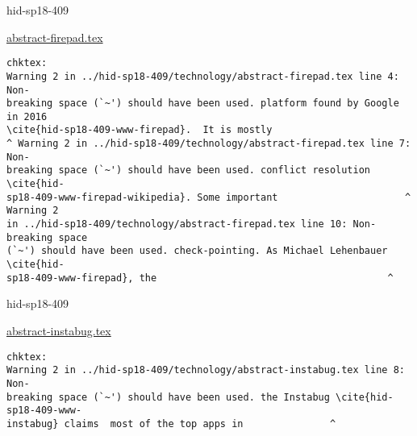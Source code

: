 

\begin{IU}

hid-sp18-409

\href{https://github.com/cloudmesh-community/hid-sp18-409/blob/master//technology/abstract-firepad.tex}{abstract-firepad.tex}

\begin{tiny}
\begin{verbatim}
chktex:
Warning 2 in ../hid-sp18-409/technology/abstract-firepad.tex line 4: Non-
breaking space (`~') should have been used. platform found by Google in 2016
\cite{hid-sp18-409-www-firepad}.  It is mostly
^ Warning 2 in ../hid-sp18-409/technology/abstract-firepad.tex line 7: Non-
breaking space (`~') should have been used. conflict resolution \cite{hid-
sp18-409-www-firepad-wikipedia}. Some important                      ^ Warning 2
in ../hid-sp18-409/technology/abstract-firepad.tex line 10: Non-breaking space
(`~') should have been used. check-pointing. As Michael Lehenbauer \cite{hid-
sp18-409-www-firepad}, the                                        ^
\end{verbatim}
\end{tiny}
\end{IU}



\begin{IU}

hid-sp18-409

\href{https://github.com/cloudmesh-community/hid-sp18-409/blob/master//technology/abstract-instabug.tex}{abstract-instabug.tex}

\begin{tiny}
\begin{verbatim}
chktex:
Warning 2 in ../hid-sp18-409/technology/abstract-instabug.tex line 8: Non-
breaking space (`~') should have been used. the Instabug \cite{hid-sp18-409-www-
instabug} claims  most of the top apps in               ^
\end{verbatim}
\end{tiny}
\end{IU}



